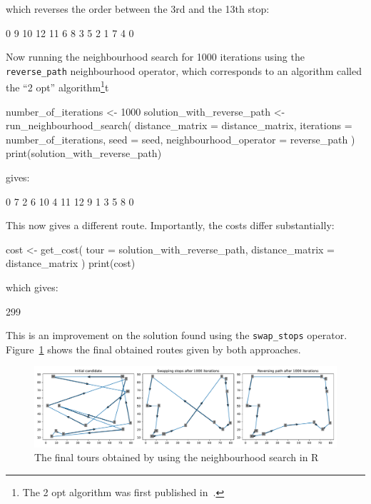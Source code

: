 which reverses the order
between the 3rd and the 13th stop:

\begin{Rout}
 [1]  0  9 10 12 11  6  8  3  5  2  1  7  4  0
\end{Rout}

Now running the neighbourhood search for 1000 iterations using the
\texttt{reverse_path} neighbourhood operator, which corresponds to
an algorithm called the ``2 opt'' algorithm\footnote{The 2 opt algorithm was
first published in~\autocite{croes1958method}.
}t

\begin{Rin}
number_of_iterations <- 1000
solution_with_reverse_path <- run_neighbourhood_search(
    distance_matrix = distance_matrix,
    iterations = number_of_iterations,
    seed = seed,
    neighbourhood_operator = reverse_path
)
print(solution_with_reverse_path)
\end{Rin}

gives:

\begin{Rout}
 [1]  0  7  2  6 10  4 11 12  9  1  3  5  8  0
\end{Rout}

This now gives a different route.
Importantly, the costs differ substantially:

\begin{Rin}
cost <- get_cost(
    tour = solution_with_reverse_path,
    distance_matrix = distance_matrix
)
print(cost)
\end{Rin}

which gives:

\begin{Rout}
[1] 299
\end{Rout}

This is an improvement on the solution found using the \texttt{swap_stops}
operator. Figure~\ref{fig:final-tsp-tours-r} shows the final obtained routes
given by both approaches.


\begin{figure}
    \begin{center}
        \includegraphics[width=\textwidth]{./assets/final-tsp-tours-with-R/main.pdf}
    \end{center}
    \caption{The final tours obtained by using the neighbourhood search in R}
    \label{fig:final-tsp-tours-r}
\end{figure}


